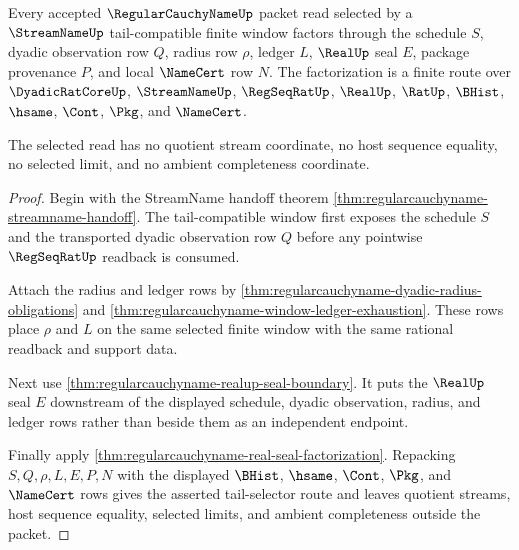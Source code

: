 \begin{theorem}
\label{thm:regularcauchyname-tail-selector-factorization}
Every accepted $\RegularCauchyNameUp$ packet read selected by a $\StreamNameUp$ tail-compatible finite window factors through the schedule $S$, dyadic observation row $Q$, radius row $\rho$, ledger $L$, $\RealUp$ seal $E$, package provenance $P$, and local $\NameCert$ row $N$. The factorization is a finite route over $\DyadicRatCoreUp$, $\StreamNameUp$, $\RegSeqRatUp$, $\RealUp$, $\RatUp$, $\BHist$, $\hsame$, $\Cont$, $\Pkg$, and $\NameCert$.

The selected read has no quotient stream coordinate, no host sequence equality, no selected limit, and no ambient completeness coordinate.
\end{theorem}
\begin{proof}
Begin with the StreamName handoff theorem \autoref{thm:regularcauchyname-streamname-handoff}. The tail-compatible window first exposes the schedule $S$ and the transported dyadic observation row $Q$ before any pointwise $\RegSeqRatUp$ readback is consumed.

Attach the radius and ledger rows by \autoref{thm:regularcauchyname-dyadic-radius-obligations} and \autoref{thm:regularcauchyname-window-ledger-exhaustion}. These rows place $\rho$ and $L$ on the same selected finite window with the same rational readback and support data.

Next use \autoref{thm:regularcauchyname-realup-seal-boundary}. It puts the $\RealUp$ seal $E$ downstream of the displayed schedule, dyadic observation, radius, and ledger rows rather than beside them as an independent endpoint.

Finally apply \autoref{thm:regularcauchyname-real-seal-factorization}. Repacking $S,Q,\rho,L,E,P,N$ with the displayed $\BHist$, $\hsame$, $\Cont$, $\Pkg$, and $\NameCert$ rows gives the asserted tail-selector route and leaves quotient streams, host sequence equality, selected limits, and ambient completeness outside the packet.
\end{proof}

